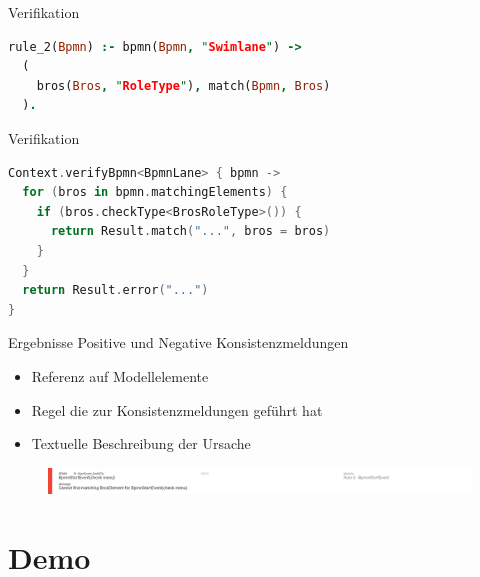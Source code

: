 \begin{frame}[fragile]{Verifikation}
\begin{lstlisting}[language=Prolog]
rule_2(Bpmn) :- bpmn(Bpmn, "Swimlane") ->
  (
    bros(Bros, "RoleType"), match(Bpmn, Bros)
  ).
\end{lstlisting}
\end{frame}
\begin{frame}[fragile]{Verifikation}
\begin{lstlisting}[language=Kotlin]
Context.verifyBpmn<BpmnLane> { bpmn ->
  for (bros in bpmn.matchingElements) {
    if (bros.checkType<BrosRoleType>()) {
      return Result.match("...", bros = bros)
    }
  }
  return Result.error("...")
}
\end{lstlisting}
\end{frame}


\begin{frame}{Ergebnisse}
  Positive und Negative Konsistenzmeldungen
  \begin{itemize}
    \item Referenz auf Modellelemente
    \item Regel die zur Konsistenzmeldungen geführt hat
    \item Textuelle Beschreibung der Ursache
  \end{itemize}
  \begin{figure}
    \centering
    \begin{adjustbox}{width=1.1\linewidth,center}
      \includegraphics{images/example/error5.png}
    \end{adjustbox}
  \end{figure}
\end{frame}

\section{Demo}